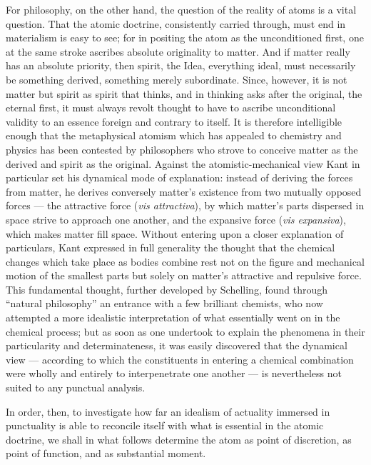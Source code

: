 \documentclass[12pt,a4paper]{book}
\begin{document}
For philosophy, on the other hand, the question of the reality of atoms is a
vital question. That the atomic doctrine, consistently carried through, must
end in materialism is easy to see; for in positing the atom as the
unconditioned first, one at the same stroke ascribes absolute originality to
matter. And if matter really has an absolute priority, then spirit, the Idea,
everything ideal, must necessarily be something derived, something merely
subordinate. Since, however, it is not
matter but spirit as spirit that thinks, and in thinking asks after the
original, the eternal first, it must always revolt thought to have to ascribe
unconditional validity to an essence foreign and contrary to itself. It is
therefore intelligible enough that the metaphysical atomism which has appealed
to chemistry and physics has been contested by philosophers who strove to
conceive matter as the derived and spirit as the original. Against the
atomistic-mechanical view Kant in particular set his dynamical mode of
explanation: instead of deriving the forces from matter, he derives conversely
matter's existence from two mutually opposed forces --- the attractive force
(\textit{vis attractiva}), by which matter's parts dispersed in space strive to
approach one another, and the expansive force (\textit{vis expansiva}), which
makes matter fill space. Without entering upon a closer explanation of
particulars, Kant expressed in full generality the thought that the chemical
changes which take place as bodies combine rest not on the figure and
mechanical motion of the smallest parts but solely on matter's attractive and
repulsive force. This fundamental thought, further developed by Schelling,
found through ``natural philosophy'' an entrance with a few brilliant chemists,
who now attempted a more idealistic interpretation of what essentially went on
in the chemical process; but as soon as one undertook to explain the phenomena
in their particularity and determinateness, it was easily discovered that the
dynamical view --- according to which the constituents in entering a chemical
combination were wholly and entirely to interpenetrate one another --- is
nevertheless not suited to any punctual analysis.

In order, then, to investigate how far an idealism of actuality immersed in
punctuality is able to reconcile itself with what is essential in the atomic
doctrine, we shall in what follows determine the atom as point of discretion,
as point of function, and as substantial moment.

\end{document}
